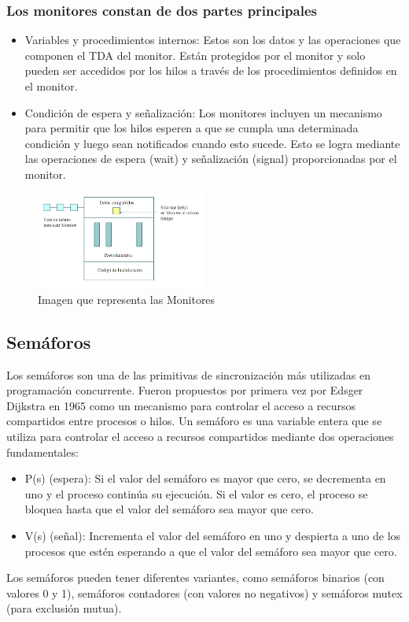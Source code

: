 \documentclass[12pt,a4paper]{article}
\begin{document}
\subsubsection*{Los monitores constan de dos partes principales}
\begin{itemize}
    \item Variables y procedimientos internos: Estos son los datos y las operaciones que componen el TDA del monitor. Están protegidos por el monitor y solo pueden ser accedidos por los hilos a través de los procedimientos definidos en el monitor.
    \item Condición de espera y señalización: Los monitores incluyen un mecanismo para permitir que los hilos esperen a que se cumpla una determinada condición y luego sean notificados cuando esto sucede. Esto se logra mediante las operaciones de espera (wait) y señalización (signal) proporcionadas por el monitor.
    
\end{itemize}
\begin{figure}[htb!]
    \centering
    \caption{Imagen que representa las Monitores } 
    \includegraphics[width=0.5\textwidth]{images/monitor.png}
    
\end{figure}

\newpage
\subsection{Semáforos}
Los semáforos son una de las primitivas de sincronización más utilizadas en programación concurrente. Fueron propuestos por primera vez por Edsger Dijkstra en 1965 como un mecanismo para controlar el acceso a recursos compartidos entre procesos o hilos.
\espacio
Un semáforo es una variable entera que se utiliza para controlar el acceso a recursos compartidos mediante dos operaciones fundamentales:
\begin{itemize}
    \item P(s) (espera): Si el valor del semáforo es mayor que cero, se decrementa en uno y el proceso continúa su ejecución. Si el valor es cero, el proceso se bloquea hasta que el valor del semáforo sea mayor que cero.
    \item V(s) (señal): Incrementa el valor del semáforo en uno y despierta a uno de los procesos que estén esperando a que el valor del semáforo sea mayor que cero.
    
\end{itemize}
Los semáforos pueden tener diferentes variantes, como semáforos binarios (con valores 0 y 1), semáforos contadores (con valores no negativos) y semáforos mutex (para exclusión mutua).
\end{document}
